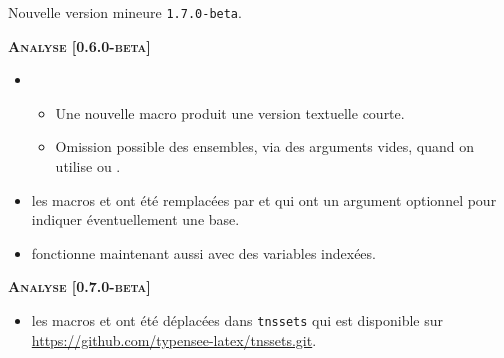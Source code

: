 \documentclass[12pt,a4paper]{book}
\begin{document}
\begin{description}
\separation

\end{description}\begin{description}
\medskip
\item[2020-08-06] Nouvelle version mineure \verb+1.7.0-beta+.




\begin{center}
    \textbf{\textsc{Analyse [0.6.0-beta]}}
\end{center}

\begin{itemize}[itemsep=.5em]
    \item {}
    \begin{itemize}[itemsep=.5em]
        \item Une nouvelle macro  produit une version textuelle courte.

        \item Omission possible des ensembles, via des arguments vides, quand on utilise  ou .
    \end{itemize}


    \item {}
          les macros  et  ont été remplacées par  et  qui ont un argument optionnel pour indiquer éventuellement une base.


    \item {}
           fonctionne maintenant aussi avec des variables indexées.
          
\end{itemize}


\begin{center}
    \textbf{\textsc{Analyse [0.7.0-beta]}}
\end{center}

\begin{itemize}[itemsep=.5em]
    \item {}
          les macros  et  ont été déplacées dans \verb#tnssets# qui est disponible sur \url{https://github.com/typensee-latex/tnssets.git}.
    

\end{itemize}
\end{description}
\end{document}
